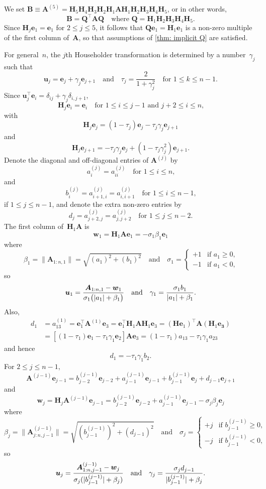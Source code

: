 \documentclass[12pt,a4paper]{article}
\newcommand{\bs}[1]{\boldsymbol{#1}}
\begin{document}
We set
$\bs{B}\equiv\bs{A}^{(5)}=\bs{H}_5\bs{H}_4\bs{H}_3\bs{H}_2\bs{H}_1\bs{A}
\bs{H}_1\bs{H}_2\bs{H}_3\bs{H}_4\bs{H}_5$, or in other words,
\[
\bs{B}=\bs{Q}^\top\bs{A}\bs{Q}
	\quad\text{where $\bs{Q}=\bs{H}_1\bs{H}_2\bs{H}_3\bs{H}_4\bs{H}_5$.}
\]
Since $\bs{H}_j\bs{e}_1=\bs{e}_1$ for $2\le j\le 5$, it follows that
$\bs{Q}\bs{e}_1=\bs{H}_1\bs{e}_1$ is a non-zero multiple of the first column 
of~$\bs{A}$, so that assumptions of \cref{thm: implicit Q} are satisfied.

For general~$n$, the $j$th Householder transformation is determined by a
number~$\gamma_j$ such that
\[
\bs{u}_j=\bs{e}_j+\gamma_j\bs{e}_{j+1}
\quad\text{and}\quad
\tau_j=\frac{2}{1+\gamma_j^2}\quad\text{for $1\le k\le n-1$.}
\]
Since $\bs{u}_j^\top\bs{e}_i=\delta_{ij}+\gamma_j\delta_{i,j+1}$,
\[
\bs{H}_j\bs{e}_i=\bs{e}_i\quad\text{for $1\le i\le j-1$ and $j+2\le i\le n$,}
\]
with
\[
\bs{H}_j\bs{e}_j=(1-\tau_j)\bs{e}_j-\tau_j\gamma_j\bs{e}_{j+1}
\]
and
\[
\bs{H}_j\bs{e}_{j+1}=-\tau_j\gamma_j\bs{e}_j+(1-\tau_j\gamma_j^2)\bs{e}_{j+1}.
\]
Denote the diagonal and off-diagonal entries of $\bs{A}^{(j)}$ by
\[
a^{(j)}_i=a^{(j)}_{ii}\quad\text{for $1\le i\le n$,}
\]
and
\[
b^{(j)}_i=a^{(j)}_{i+1,i}=a^{(j)}_{i,i+1}
\quad\text{for $1\le i\le n-1$,}
\]
if $1\le j\le n-1$, and denote the extra non-zero entries by
\[
d_j=a^{(j)}_{j+2,j}=a^{(j)}_{j,j+2}
    \quad\text{for $1\le j\le n-2$.}
\]
The first column of~$\bs{H}_1\bs{A}$ is
\[
\bs{w}_1=\bs{H}_1\bs{A}\bs{e}_1=-\sigma_1\beta_1\bs{e}_1
\]
where
\[
\beta_1=\|\bs{A}_{1:n,1}\|=\sqrt{(a_1)^2+(b_1)^2}\quad\text{and}\quad
\sigma_1=\begin{cases}
+1&\text{if $a_1\ge0$,}\\
-1&\text{if $a_1<0$,}
\end{cases}
\]
so
\[
\bs{u}_1=\frac{\bs{A}_{1:n,1}-\bs{w}_1}{%
\sigma_1\bigl(|a_1|+\beta_1\bigr)}
\quad\text{and}\quad
\gamma_1=\frac{\sigma_1b_1}{|a_1|+\beta_1}.
\]
Also,
\begin{align*}
d_1&=a^{(1)}_{13}=\bs{e}_1^\top\bs{A}^{(1)}\bs{e}_3
    =\bs{e}_1^\top\bs{H}_1\bs{A}\bs{H}_1\bs{e}_3
    =(\bs{H}\bs{e}_1)^\top\bs{A}(\bs{H}_1\bs{e_3})\\
    &=[(1-\tau_1)\bs{e}_1-\tau_1\gamma_1\bs{e}_2]\bs{A}\bs{e}_3
    =(1-\tau_1)a_{13}-\tau_1\gamma_1a_{23}
\end{align*}
and hence
\[
d_1=-\tau_1\gamma_1b_2.
\]
For $2\le j\le n-1$, 
\[
\bs{A}^{(j-1)}\bs{e}_{j-1}=b^{(j-1)}_{j-2}\bs{e}_{j-2}
    +a^{(j-1)}_{j-1}\bs{e}_{j-1}+b^{(j-1)}_{j-1}\bs{e}_j+d_{j-1}\bs{e}_{j+1}
\]
and
\[
\bs{w}_j=\bs{H}_j\bs{A}^{(j-1)}\bs{e}_{j-1}
    =b^{(j-1)}_{j-2}\bs{e}_{j-2}+a^{(j-1)}_{j-1}\bs{e}_{j-1}
    -\sigma_j\beta_j\bs{e}_j
\]
where
\[
\beta_j=\|\bs{A}^{(j-1)}_{j:n,j-1}\|=\sqrt{(b^{(j-1)}_{j-1})^2+(d_{j-1})^2}
\quad\text{and}\quad
\sigma_j=\begin{cases}
+j&\text{if $b^{(j-1)}_{j-1}\ge0$,}\\
-j&\text{if $b^{(j-1)}_{j-1}<0$,}
\end{cases}
\]
so
\[
\bs{u}_j=\frac{\bs{A}^{(j-1)}_{1:n,j-1}-\bs{w}_j}{%
\sigma_j(|b^{(j-1)}_{j-1}|+\beta_j)}
\quad\text{and}\quad
\gamma_j=\frac{\sigma_jd_{j-1}}{|b^{(j-1)}_{j-1}|+\beta_j}.
\]
\end{document}
